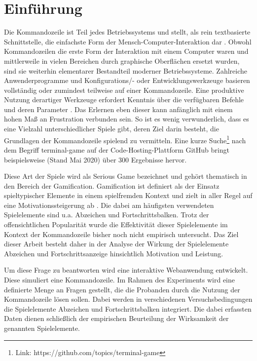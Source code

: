 \section{Einführung}
Die Kommandozeile ist Teil jedes Betriebssystems und stellt, als rein textbasierte Schnittstelle, die einfachste Form der Mensch-Computer-Interaktion dar \cite{Kumar2005}. Obwohl Kommandozeilen die erste Form der Interaktion mit einem Computer waren und mittlerweile in vielen Bereichen durch graphische Oberflächen ersetzt wurden, sind sie weiterhin elementarer Bestandteil moderner Betriebssysteme. Zahlreiche Anwenderprogramme und Konfigurations/- oder Entwicklungswerkzeuge basieren vollständig oder zumindest teilweise auf einer Kommandozeile. Eine produktive Nutzung derartiger Werkzeuge erfordert Kenntnis über die verfügbaren Befehle und deren Parameter \cite[S.42]{Kumar2005}. Das Erlernen eben dieser kann anfänglich mit einem hohen Maß an Frustration verbunden sein. So ist es wenig verwunderlich, dass es eine Vielzahl unterschiedlicher Spiele gibt, deren Ziel darin besteht, die Grundlagen der Kommandozeile spielend zu vermitteln. Eine kurze Suche\footnote{Link: https://github.com/topics/terminal-game} nach dem Begriff \glqq terminal-game\grqq{} auf der Code-Hosting-Plattform GitHub bringt beispielsweise (Stand Mai  2020)  über  300  Ergebnisse  hervor. 

Diese Art der Spiele wird als Serious Game bezeichnet und gehört thematisch in den Bereich der Gamification. Gamification ist definiert als der Einsatz spieltypischer Elemente in einem spielfremden Kontext \cite{deterding_game_2011} und zielt in aller Regel auf eine Motivationssteigerung ab \cite{takahashi_gamification_2010}. Die  dabei  am  häufigsten  verwendeten  Spielelemente sind u.a. Abzeichen und Fortschrittsbalken. Trotz der offensichtlichen Popularität wurde die Effektivität dieser Spielelemente im Kontext der Kommandozeile bisher noch nicht empirisch untersucht. Das Ziel dieser Arbeit besteht daher in der Analyse der Wirkung der Spielelemente Abzeichen und Fortschrittsanzeige hinsichtlich Motivation und Leistung.

Um diese Frage zu beantworten wird eine interaktive Webanwendung entwickelt. Diese simuliert eine Kommandozeile. Im Rahmen des Experiments wird eine definierte Menge an Fragen gestellt, die die Probanden durch die Nutzung der Kommandozeile lösen sollen. Dabei  werden  in  verschiedenen  Versuchsbedingungen die Spielelemente Abzeichen und Fortschrittsbalken integriert. Die dabei erfassten Daten dienen schließlich der empirischen Beurteilung der Wirksamkeit der genannten Spielelemente.

